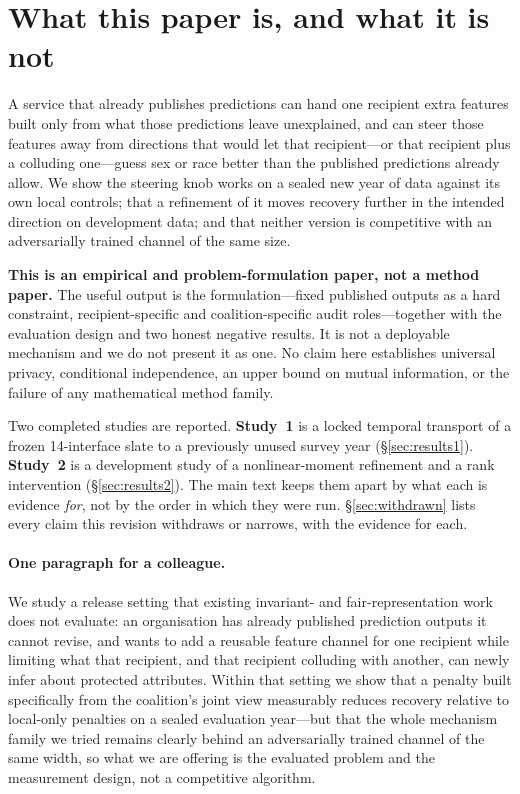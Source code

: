 \documentclass[10pt]{article}
\begin{document}
\section{What this paper is, and what it is not}
\label{sec:contribution}

A service that already publishes predictions can hand one recipient extra features built only from
what those predictions leave unexplained, and can steer those features away from directions that
would let that recipient---or that recipient plus a colluding one---guess sex or race better than
the published predictions already allow. We show the steering knob works on a sealed new year of
data against its own local controls; that a refinement of it moves recovery further in the intended
direction on development data; and that neither version is competitive with an adversarially
trained channel of the same size.

\textbf{This is an empirical and problem-formulation paper, not a method paper.} The useful output
is the formulation---fixed published outputs as a hard constraint, recipient-specific and
coalition-specific audit roles---together with the evaluation design and two honest negative
results. It is not a deployable mechanism and we do not present it as one. No claim here
establishes universal privacy, conditional independence, an upper bound on mutual information, or
the failure of any mathematical method family.

Two completed studies are reported. \textbf{Study~1} is a locked temporal transport of a frozen
14-interface slate to a previously unused survey year (\S\ref{sec:results1}). \textbf{Study~2} is a
development study of a nonlinear-moment refinement and a rank intervention
(\S\ref{sec:results2}). The main text keeps them apart by what each is evidence \emph{for}, not by
the order in which they were run. \S\ref{sec:withdrawn} lists every claim this revision withdraws
or narrows, with the evidence for each.

\paragraph{One paragraph for a colleague.} We study a release setting that existing invariant- and
fair-representation work does not evaluate: an organisation has already published prediction
outputs it cannot revise, and wants to add a reusable feature channel for one recipient while
limiting what that recipient, and that recipient colluding with another, can newly infer about
protected attributes. Within that setting we show that a penalty built specifically from the
coalition's joint view measurably reduces recovery relative to local-only penalties on a sealed
evaluation year---but that the whole mechanism family we tried remains clearly behind an
adversarially trained channel of the same width, so what we are offering is the evaluated problem
and the measurement design, not a competitive algorithm.
\end{document}

